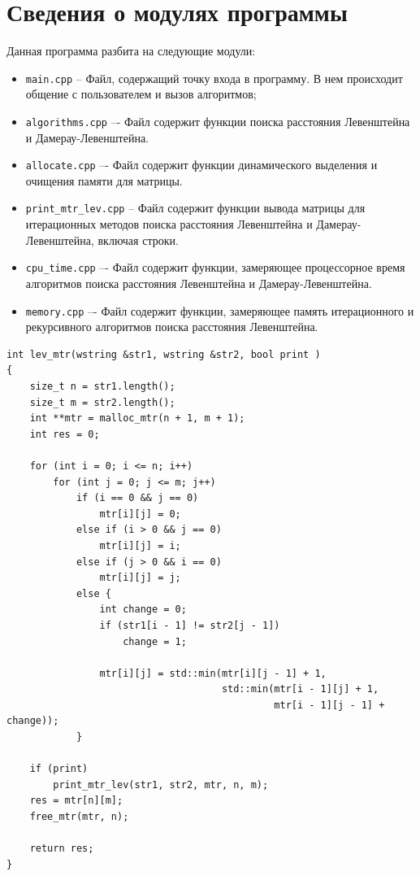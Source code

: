 \documentclass[a4paper,14pt, unknownkeysallowed]{bmstu}
\begin{document}
\section{Сведения о модулях программы}

Данная программа разбита на следующие модули:

\begin{itemize}
	\item \texttt{main.cpp} -- Файл, содержащий точку входа в программу. В нем происходит
общение с пользователем и вызов алгоритмов;
    \item \texttt{algorithms.cpp} –- Файл содержит функции поиска расстояния Левенштейна и Дамерау-Левенштейна.
    \item \texttt{allocate.cpp} –- Файл содержит функции динамического выделения и очищения памяти для матрицы.
    \item \texttt{print\_mtr\_lev.cpp} -- Файл содержит функции вывода матрицы для итерационных методов поиска расстояния Левенштейна и Дамерау-Левенштейна, включая строки.
    \item \texttt{cpu\_time.cpp} –- Файл содержит функции, замеряющее процессорное время алгоритмов поиска расстояния Левенштейна и Дамерау-Левенштейна.
    \item \texttt{memory.cpp} –- Файл содержит функции, замеряющее память итерационного и рекурсивного алгоритмов поиска расстояния Левенштейна.
\end{itemize}

\begin{lstlisting}[label=lst:lev_mtr,caption=Функция нахождения расстояния Левенштейна с использованием матрицы]
int lev_mtr(wstring &str1, wstring &str2, bool print )
{
    size_t n = str1.length();
    size_t m = str2.length();
    int **mtr = malloc_mtr(n + 1, m + 1);
    int res = 0;

    for (int i = 0; i <= n; i++)
        for (int j = 0; j <= m; j++)
            if (i == 0 && j == 0)
                mtr[i][j] = 0;
            else if (i > 0 && j == 0)
                mtr[i][j] = i;
            else if (j > 0 && i == 0)
                mtr[i][j] = j;
            else {
                int change = 0;
                if (str1[i - 1] != str2[j - 1])
                    change = 1;

                mtr[i][j] = std::min(mtr[i][j - 1] + 1,
                                     std::min(mtr[i - 1][j] + 1,
                                              mtr[i - 1][j - 1] + change));
            }

    if (print)
        print_mtr_lev(str1, str2, mtr, n, m);
    res = mtr[n][m];
    free_mtr(mtr, n);

    return res;
}
\end{lstlisting}
\end{document}
